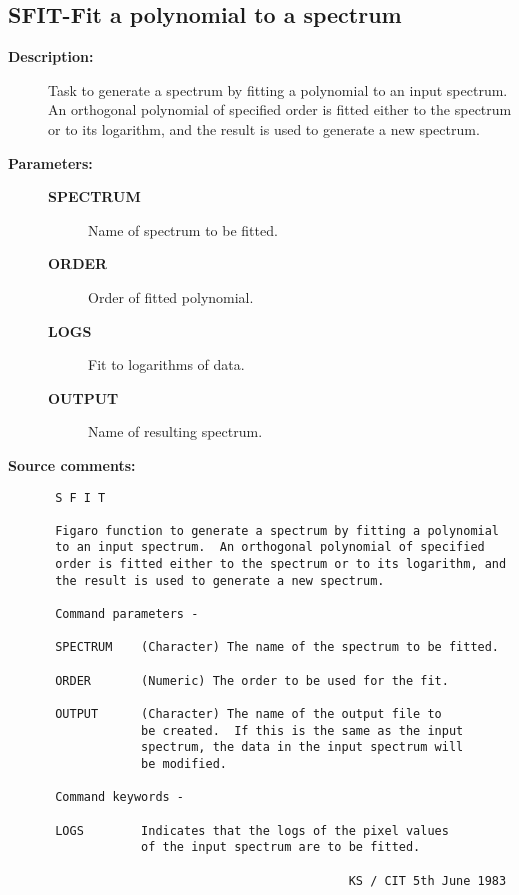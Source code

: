 \subsection{SFIT-\label{SFIT}Fit a polynomial to a spectrum}
\begin{description}

\item [{\bf Description:}]
 Task to generate a spectrum by fitting a polynomial to
 an input spectrum.  An orthogonal polynomial of specified
 order is fitted either to the spectrum or to its logarithm,
 and the result is used to generate a new spectrum.

\item [{\bf Parameters:}]
\begin{description}
\item [{\bf SPECTRUM}]
 Name of spectrum to be fitted.
\item [{\bf ORDER}]
 Order of fitted polynomial.
\item [{\bf LOGS}]
 Fit to logarithms of data.
\item [{\bf OUTPUT}]
 Name of resulting spectrum.
\end{description}

\item [{\bf Source comments:}]
\begin{verbatim}
 S F I T

 Figaro function to generate a spectrum by fitting a polynomial
 to an input spectrum.  An orthogonal polynomial of specified
 order is fitted either to the spectrum or to its logarithm, and
 the result is used to generate a new spectrum.

 Command parameters -

 SPECTRUM    (Character) The name of the spectrum to be fitted.

 ORDER       (Numeric) The order to be used for the fit.

 OUTPUT      (Character) The name of the output file to
             be created.  If this is the same as the input
             spectrum, the data in the input spectrum will
             be modified.

 Command keywords -

 LOGS        Indicates that the logs of the pixel values
             of the input spectrum are to be fitted.

                                          KS / CIT 5th June 1983
\end{verbatim}
\end{description}
